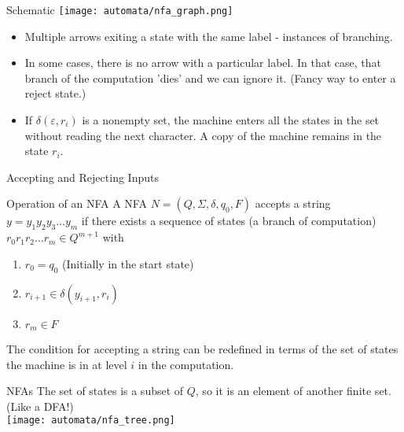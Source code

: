 \documentclass{beamer}
\begin{document}
\begin{frame}{Schematic}
\texttt{[image: automata/nfa\_graph.png]}
\begin{itemize}
    \item Multiple arrows exiting a state with the same label - instances of branching.
    \item In some cases, there is no arrow with a particular label. In that case, that branch of the computation 'dies' and we can ignore it. (Fancy way to enter a reject state.)
    \item If \(\delta( \varepsilon, r_i)\) is a nonempty set, the machine enters all the states in the set without reading the next character. A copy of the machine remains in the state \(r_i\).
\end{itemize}
\end{frame}
\begin{frame}{Accepting and Rejecting Inputs}
\begin{block}{Operation of an NFA}
    A NFA \(N = (Q, \Sigma, \delta, q_0, F) \) accepts a string \(y = y_1y_2y_3\dots y_m\) if there exists a sequence of states (a branch of computation) \(r_0 r_1 r_2 \dots r_m \in Q^{m+1}\) with \begin{enumerate}
        \item \(r_0 = q_0\) (Initially in the start state)
        \item \(r_{i+1} \in \delta (y_{i+1}, r_i)\)
        \item \(r_m \in F\)
    \end{enumerate}
\end{block}
\pause
The condition for accepting a string can be redefined in terms of the set of states the machine is in at level \(i\) in the computation.
\end{frame}
\begin{frame}{NFAs}
The set of states is a subset of \(Q\), so it is an element of another finite set. (Like a DFA!)\\
\texttt{[image: automata/nfa\_tree.png]}
\end{frame}
\end{document}
